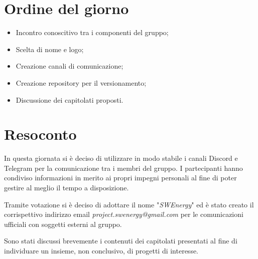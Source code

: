 \section{Ordine del giorno}
\begin{itemize}
    \item Incontro conoscitivo tra i componenti del gruppo;
    \item Scelta di nome e logo;
    \item Creazione canali di comunicazione;
    \item Creazione repository per il versionamento;
    \item Discussione dei capitolati proposti.
\end{itemize}

\section{Resoconto}
In questa giornata si è deciso di utilizzare in modo stabile i canali Discord e Telegram per la comunicazione tra i membri del gruppo.
I partecipanti hanno condiviso informazioni in merito ai propri impegni personali al fine di poter gestire al meglio il tempo a disposizione. 

Tramite votazione si è deciso di adottare il nome "\textit{SWEnergy}" ed è stato creato il corrispettivo indirizzo email \textit{project.swenergy@gmail.com} per le comunicazioni ufficiali con soggetti esterni al gruppo. 

Sono stati discussi brevemente i contenuti dei capitolati presentati al fine di individuare un insieme, non conclusivo, di progetti di interesse.